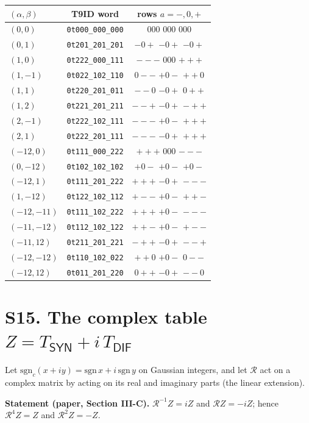 \documentclass[10pt,a4paper]{article}
\begin{document}
\begin{center}\scriptsize\begin{tabular}{lcc}\toprule $(\alpha,\beta)$&T9ID word&rows $a=-,0,+$\\\midrule
$(0,0)$&\texttt{0t000\_000\_000}&$000$ $000$ $000$\\
$(0,1)$&\texttt{0t201\_201\_201}&$-0+$ $-0+$ $-0+$\\
$(1,0)$&\texttt{0t222\_000\_111}&$---$ $000$ $+++$\\
$(1,-1)$&\texttt{0t022\_102\_110}&$0--$ $+0-$ $++0$\\
$(1,1)$&\texttt{0t220\_201\_011}&$--0$ $-0+$ $0++$\\
$(1,2)$&\texttt{0t221\_201\_211}&$--+$ $-0+$ $-++$\\
$(2,-1)$&\texttt{0t222\_102\_111}&$---$ $+0-$ $+++$\\
$(2,1)$&\texttt{0t222\_201\_111}&$---$ $-0+$ $+++$\\
$(-12,0)$&\texttt{0t111\_000\_222}&$+++$ $000$ $---$\\
$(0,-12)$&\texttt{0t102\_102\_102}&$+0-$ $+0-$ $+0-$\\
$(-12,1)$&\texttt{0t111\_201\_222}&$+++$ $-0+$ $---$\\
$(1,-12)$&\texttt{0t122\_102\_112}&$+--$ $+0-$ $++-$\\
$(-12,-11)$&\texttt{0t111\_102\_222}&$+++$ $+0-$ $---$\\
$(-11,-12)$&\texttt{0t112\_102\_122}&$++-$ $+0-$ $+--$\\
$(-11,12)$&\texttt{0t211\_201\_221}&$-++$ $-0+$ $--+$\\
$(-12,-12)$&\texttt{0t110\_102\_022}&$++0$ $+0-$ $0--$\\
$(-12,12)$&\texttt{0t011\_201\_220}&$0++$ $-0+$ $--0$\\
\bottomrule\end{tabular}\end{center}

\section*{S15. The complex table $Z=T_{\mathsf{SYN}}+i\,T_{\mathsf{DIF}}$}
Let $\mathrm{sgn}_c(x+iy)=\mathrm{sgn}\,x+i\,\mathrm{sgn}\,y$ on Gaussian integers, and let $\mathcal R$ act on a complex matrix by acting on its real and imaginary parts (the linear extension).

\textbf{Statement (paper, Section III-C).} $\mathcal R^{-1}Z=iZ$ and $\mathcal RZ=-iZ$; hence $\mathcal R^4Z=Z$ and $\mathcal R^2Z=-Z$.
\end{document}
